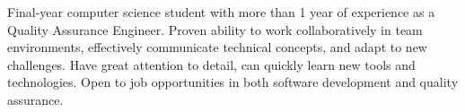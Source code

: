 

\begin{cvparagraph}

Final-year computer science student with more than 1 year of experience as a Quality Assurance Engineer. Proven ability to work collaboratively in team environments, effectively communicate technical concepts, and adapt to new challenges. Have great attention to detail, can quickly learn new tools and technologies. Open to job opportunities in both software development and quality assurance.
\end{cvparagraph}